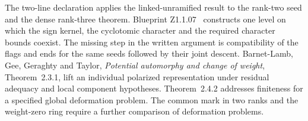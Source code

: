 The two-line declaration applies the linked-unramified result to the rank-two
seed and the dense rank-three theorem. Blueprint Z1.1.07~ constructs
one level on which the sign kernel, the cyclotomic character and the
required character bounds coexist. The missing step in the written argument
is compatibility of the flags and ends for the same seeds followed by
their joint descent. Barnet-Lamb, Gee, Geraghty and Taylor,
\emph{Potential automorphy and change of weight}, Theorem~2.3.1,
lift an individual polarized representation under residual adequacy and
local component hypotheses. Theorem~2.4.2 addresses finiteness for a
specified global deformation problem. The common mark in two ranks and
the weight-zero ring require a further comparison of deformation problems.
\cite{r21-blggt}
